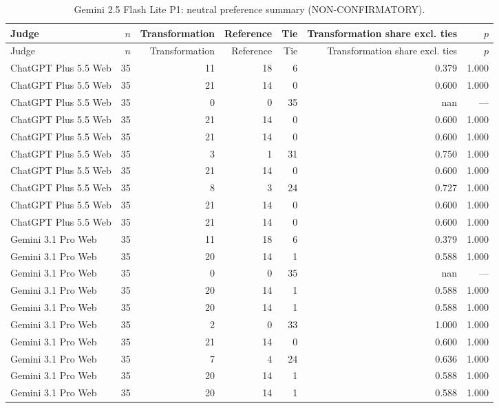 \documentclass[10pt]{article}
\begin{document}
\begin{longtable}{lrrrrrr}
\caption{Gemini 2.5 Flash Lite P1: neutral preference summary (NON-CONFIRMATORY).}\label{tab:s13-neupref25p1}\\
\toprule Judge & $n$ & Transformation & Reference & Tie & Transformation share excl. ties & $p$ \\ \midrule\endfirsthead
\toprule Judge & $n$ & Transformation & Reference & Tie & Transformation share excl. ties & $p$ \\ \midrule\endhead
\bottomrule\endfoot
ChatGPT Plus 5.5 Web & 35 & 11 & 18 & 6 & 0.379 & 1.000 \\
ChatGPT Plus 5.5 Web & 35 & 21 & 14 & 0 & 0.600 & 1.000 \\
ChatGPT Plus 5.5 Web & 35 & 0 & 0 & 35 & nan & — \\
ChatGPT Plus 5.5 Web & 35 & 21 & 14 & 0 & 0.600 & 1.000 \\
ChatGPT Plus 5.5 Web & 35 & 21 & 14 & 0 & 0.600 & 1.000 \\
ChatGPT Plus 5.5 Web & 35 & 3 & 1 & 31 & 0.750 & 1.000 \\
ChatGPT Plus 5.5 Web & 35 & 21 & 14 & 0 & 0.600 & 1.000 \\
ChatGPT Plus 5.5 Web & 35 & 8 & 3 & 24 & 0.727 & 1.000 \\
ChatGPT Plus 5.5 Web & 35 & 21 & 14 & 0 & 0.600 & 1.000 \\
ChatGPT Plus 5.5 Web & 35 & 21 & 14 & 0 & 0.600 & 1.000 \\
Gemini 3.1 Pro Web & 35 & 11 & 18 & 6 & 0.379 & 1.000 \\
Gemini 3.1 Pro Web & 35 & 20 & 14 & 1 & 0.588 & 1.000 \\
Gemini 3.1 Pro Web & 35 & 0 & 0 & 35 & nan & — \\
Gemini 3.1 Pro Web & 35 & 20 & 14 & 1 & 0.588 & 1.000 \\
Gemini 3.1 Pro Web & 35 & 20 & 14 & 1 & 0.588 & 1.000 \\
Gemini 3.1 Pro Web & 35 & 2 & 0 & 33 & 1.000 & 1.000 \\
Gemini 3.1 Pro Web & 35 & 21 & 14 & 0 & 0.600 & 1.000 \\
Gemini 3.1 Pro Web & 35 & 7 & 4 & 24 & 0.636 & 1.000 \\
Gemini 3.1 Pro Web & 35 & 20 & 14 & 1 & 0.588 & 1.000 \\
Gemini 3.1 Pro Web & 35 & 20 & 14 & 1 & 0.588 & 1.000 \\
\end{longtable}
\end{document}
